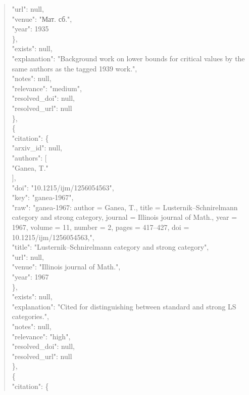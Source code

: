 \documentclass[11pt]{article}
\begin{document}
\begin{quote}
        "url": null,\\
        "venue": "Мат. сб.",\\
        "year": 1935\\
      \},\\
      "exists": null,\\
      "explanation": "Background work on lower bounds for critical values by the same authors as the tagged 1939 work.",\\
      "notes": null,\\
      "relevance": "medium",\\
      "resolved\_doi": null,\\
      "resolved\_url": null\\
    \},\\
    \{\\
      "citation": \{\\
        "arxiv\_id": null,\\
        "authors": [\\
          "Ganea, T."\\
        ],\\
        "doi": "10.1215/ijm/1256054563",\\
        "key": "ganea-1967",\\
        "raw": "ganea-1967: author = Ganea, T., title = Lusternik--Schnirelmann category and strong category, journal = Illinois journal of Math., year = 1967, volume = 11, number = 2, pages = 417--427, doi = 10.1215/ijm/1256054563,",\\
        "title": "Lusternik--Schnirelmann category and strong category",\\
        "url": null,\\
        "venue": "Illinois journal of Math.",\\
        "year": 1967\\
      \},\\
      "exists": null,\\
      "explanation": "Cited for distinguishing between standard and strong LS categories.",\\
      "notes": null,\\
      "relevance": "high",\\
      "resolved\_doi": null,\\
      "resolved\_url": null\\
    \},\\
    \{\\
      "citation": \{\\

\end{quote}
\end{document}
